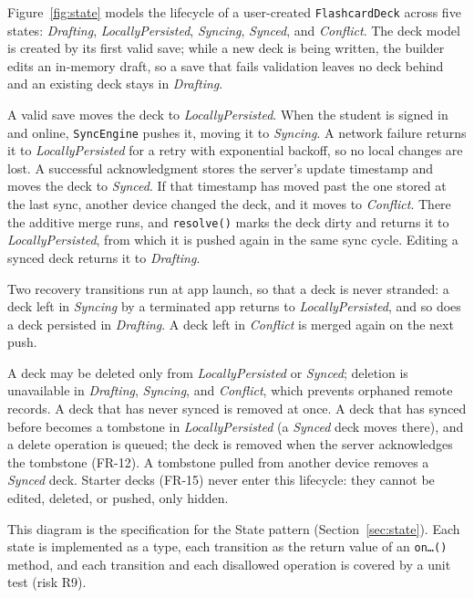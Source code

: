 \documentclass[12pt,letterpaper]{article}
\begin{document}
Figure~\ref{fig:state} models the lifecycle of a user-created \texttt{FlashcardDeck}
across five states: \emph{Drafting}, \emph{LocallyPersisted}, \emph{Syncing},
\emph{Synced}, and \emph{Conflict}. The deck model is created by its first valid save;
while a new deck is being written, the builder edits an in-memory draft, so a save that
fails validation leaves no deck behind and an existing deck stays in \emph{Drafting}.

A valid save moves the deck to \emph{LocallyPersisted}. When the student is signed in
and online, \texttt{SyncEngine} pushes it, moving it to \emph{Syncing}. A network
failure returns it to \emph{LocallyPersisted} for a retry with exponential backoff, so
no local changes are lost. A successful acknowledgment stores the server's update
timestamp and moves the deck to \emph{Synced}. If that timestamp has moved past the one
stored at the last sync, another device changed the deck, and it moves to
\emph{Conflict}. There the additive merge runs, and \texttt{resolve()} marks the deck
dirty and returns it to \emph{LocallyPersisted}, from which it is pushed again in the
same sync cycle. Editing a synced deck returns it to \emph{Drafting}.

Two recovery transitions run at app launch, so that a deck is never stranded: a deck
left in \emph{Syncing} by a terminated app returns to \emph{LocallyPersisted}, and so
does a deck persisted in \emph{Drafting}. A deck left in \emph{Conflict} is merged
again on the next push.

A deck may be deleted only from \emph{LocallyPersisted} or \emph{Synced}; deletion is
unavailable in \emph{Drafting}, \emph{Syncing}, and \emph{Conflict}, which prevents
orphaned remote records. A deck that has never synced is removed at once. A deck that
has synced before becomes a tombstone in \emph{LocallyPersisted} (a \emph{Synced} deck
moves there), and a delete operation is queued; the deck is removed when the server
acknowledges the tombstone (FR-12). A tombstone pulled from another device removes a
\emph{Synced} deck. Starter decks (FR-15) never enter this lifecycle: they cannot be
edited, deleted, or pushed, only hidden.

This diagram is the specification for the State pattern (Section~\ref{sec:state}).
Each state is implemented as a type, each transition as the return value of an
\texttt{on\ldots()} method, and each transition and each disallowed operation is
covered by a unit test (risk R9).

\end{document}
